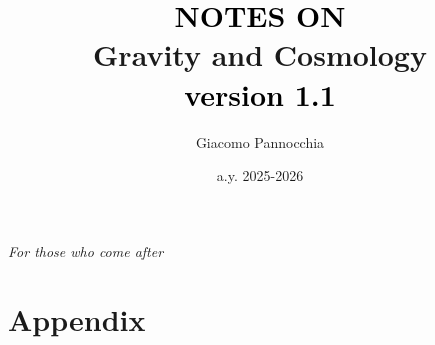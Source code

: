 \documentclass[a4paper,twoside,openright,titlepage,
               headinclude,footinclude,BCOR5mm,
               numbers=noenddot,cleardoublepage=empty,
               tablecaptionabove]{scrbook}
\author{Giacomo Pannocchia}
\title{\textcolor{black}{NOTES ON}\\ \textcolor{RawSienna}{Gravity and Cosmology} \\ \vspace{7pt}\large \quad \quad \quad \quad \quad \textcolor{black}{version 1.1}}
\date{a.y. 2025-2026}
\begin{document}
  \begin{titlepage}
    \maketitle
  \end{titlepage}

\cleardoublepage
\newpage

\pagestyle{empty}

\thispagestyle{empty}
    \null{}
        \begin{flushright}
          \Large
                \emph{For those who come after}
        
        \end{flushright}
\null

\cleardoublepage
\newpage

\pagestyle{empty}
\setcounter{page}{1}

% 



\cleardoublepage
\newpage

\tableofcontents
\cleardoublepage
\newpage

\mainmatter
\pagestyle{scrheadings}

\setcounter{page}{1}









\part{Appendix}


\cleardoublepage
{}


\cleardoublepage
{}
{}
\small


\end{document}
